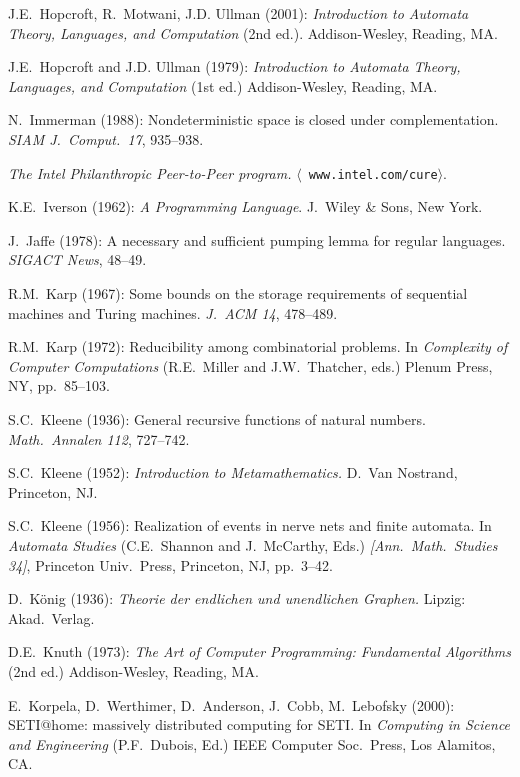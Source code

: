 \begin{thebibliography}{999}
J.E.~Hopcroft, R.~Motwani, J.D. Ullman (2001):
{\it Introduction to Automata Theory, Languages, and Computation} (2nd
ed.).
Addison-Wesley, Reading, MA.

J.E.~Hopcroft and J.D. Ullman (1979):
{\it Introduction to Automata Theory, Languages, and Computation} (1st
ed.)
Addison-Wesley, Reading, MA.


N.~Immerman (1988): Nondeterministic space is closed under
complementation.  {\it SIAM J.~Comput.~17}, 935--938.

{\it The Intel Philanthropic Peer-to-Peer program.}  $\langle${\tt
www.intel.com/cure}$\rangle$.

K.E.~Iverson (1962):
{\it A Programming Language}.
J.~Wiley \& Sons, New York.


J.~Jaffe (1978): A necessary and sufficient pumping lemma for regular
languages.  {\it SIGACT News}, 48--49.


R.M.~Karp (1967): Some bounds on the storage requirements of
sequential machines and Turing machines.  {\it J.~ACM 14}, 478--489.

R.M.~Karp (1972): Reducibility among combinatorial problems.  In {\it
Complexity of Computer Computations} (R.E.~Miller and J.W.~Thatcher,
eds.)  Plenum Press, NY, pp.~85--103.

S.C.~Kleene (1936): General recursive functions of natural numbers.
{\it Math.~Annalen 112}, 727--742.

S.C.~Kleene (1952):
{\it Introduction to Metamathematics.}
D.~Van Nostrand, Princeton, NJ.

S.C.~Kleene (1956): Realization of events in nerve nets and finite
automata.  In {\it Automata Studies} (C.E.~Shannon and J.~McCarthy,
Eds.) {\it [Ann.~Math.~Studies 34]}, Princeton Univ.~Press, Princeton,
NJ, pp.~3--42.

D.~K\"onig (1936):
{\it Theorie der endlichen und unendlichen Graphen.}  Lipzig: Akad.~Verlag.

D.E.~Knuth (1973): {\it The Art of Computer Programming: Fundamental
Algorithms} (2nd ed.)  Addison-Wesley, Reading, MA.

E.~Korpela, D.~Werthimer, D.~Anderson, J.~Cobb, M.~Lebofsky (2000):
SETI@home: massively distributed computing for SETI.  In {\it
Computing in Science and Engineering} (P.F.~Dubois, Ed.)  IEEE
Computer Soc.~Press, Los Alamitos, CA.


\end{thebibliography}
